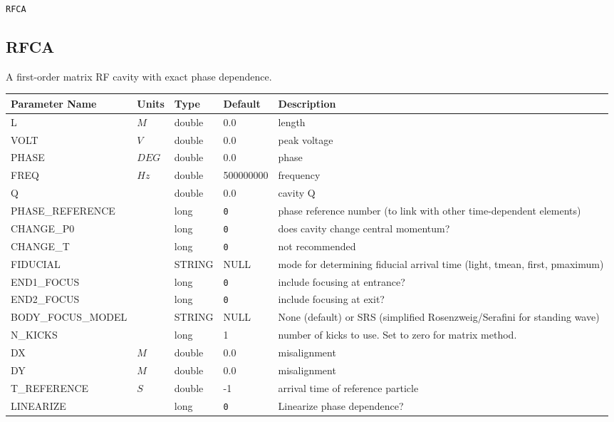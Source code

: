 \begin{latexonly}
\newpage
\begin{center}{\Large\verb|RFCA|}\end{center}
\end{latexonly}\subsection{RFCA}
A first-order matrix RF cavity with exact phase dependence.
\\
\begin{tabular}{|l|l|l|l|p{\descwidth}|} \hline
Parameter Name & Units & Type & Default & Description \\ \hline 
L & $M$ & double &  0.0 & length  \\ \hline 
VOLT & $V$ & double &  0.0 & peak voltage  \\ \hline 
PHASE & $DEG$ & double &  0.0 & phase  \\ \hline 
FREQ & $Hz$ & double &   500000000 & frequency  \\ \hline 
Q &  & double &  0.0 & cavity Q  \\ \hline 
PHASE\_REFERENCE &  & long &  \verb|0| & phase reference number (to link with other time-dependent elements)  \\ \hline 
CHANGE\_P0 &  & long &  \verb|0| & does cavity change central momentum?  \\ \hline 
CHANGE\_T &  & long &  \verb|0| & not recommended  \\ \hline 
FIDUCIAL &  & STRING &   NULL            & mode for determining fiducial arrival time (light, tmean, first, pmaximum)  \\ \hline 
END1\_FOCUS &  & long &  \verb|0| & include focusing at entrance?  \\ \hline 
END2\_FOCUS &  & long &  \verb|0| & include focusing at exit?  \\ \hline 
BODY\_FOCUS\_MODEL &  & STRING &   NULL            & None (default) or SRS (simplified Rosenzweig/Serafini for standing wave)  \\ \hline 
N\_KICKS &  & long &   1               & number of kicks to use.  Set to zero for matrix method.  \\ \hline 
DX & $M$ & double &  0.0 & misalignment  \\ \hline 
DY & $M$ & double &  0.0 & misalignment  \\ \hline 
T\_REFERENCE & $S$ & double &   -1 & arrival time of reference particle  \\ \hline 
LINEARIZE &  & long &  \verb|0| & Linearize phase dependence?  \\ \hline 
\end{tabular}

